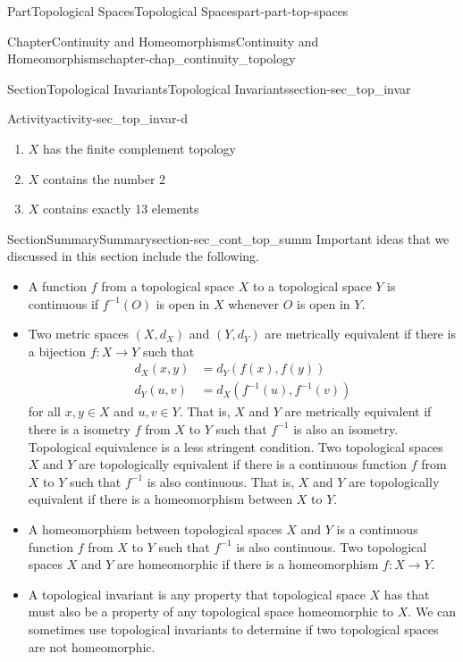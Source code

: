 \documentclass[oneside,10pt,]{book}
\numberwithin{equation}{chapter}
\newcommand{\amp}{&}
\begin{document}
\begin{partptx}{Part}{Topological Spaces}{}{Topological Spaces}{}{}{part-part-top-spaces}
\begin{chapterptx}{Chapter}{Continuity and Homeomorphisms}{}{Continuity and Homeomorphisms}{}{}{chapter-chap_continuity_topology}
\begin{sectionptx}{Section}{Topological Invariants}{}{Topological Invariants}{}{}{section-sec_top_invar}
\begin{activity}{Activity}{}{activity-sec_top_invar-d}
\begin{enumerate}[font=\bfseries,label=(\alph*),ref=\alph*]
\item{}\(X\) has the finite complement topology%
\item{}\(X\) contains the number 2%
\item{}\(X\) contains exactly 13 elements%
\end{enumerate}%
\end{activity}%
\end{sectionptx}
%
%
\typeout{************************************************}
\typeout{************************************************}
%
\begin{sectionptx}{Section}{Summary}{}{Summary}{}{}{section-sec_cont_top_summ}
Important ideas that we discussed in this section include the following.%
\begin{itemize}[label=\textbullet]
\item{}A function \(f\) from a topological space \(X\) to a topological space \(Y\) is continuous if \(f^{-1}(O)\) is open in \(X\) whenever \(O\) is open in \(Y\).%
\item{}Two metric spaces \((X,d_X)\) and \((Y,d_Y)\) are metrically equivalent if there is a bijection \(f : X \to Y\) such that%
\begin{align*}
d_X(x,y) \amp = d_Y(f(x),f(y))\\
d_Y(u,v) \amp = d_X(f^{-1}(u), f^{-1}(v))
\end{align*}
for all \(x,y \in X\) and \(u,v \in Y\). That is, \(X\) and \(Y\) are metrically equivalent if there is a isometry \(f\) from \(X\) to \(Y\) such that \(f^{-1}\) is also an isometry. Topological equivalence is a less stringent condition. Two topological spaces \(X\) and \(Y\) are topologically equivalent if there is a continuous function \(f\) from \(X\) to \(Y\) such that \(f^{-1}\) is also continuous. That is, \(X\) and \(Y\) are topologically equivalent if there is a homeomorphism between \(X\) to \(Y\).%
\item{}A homeomorphism between topological spaces \(X\) and \(Y\) is a continuous function \(f\) from \(X\) to \(Y\) such that \(f^{-1}\) is also continuous. Two topological spaces \(X\) and \(Y\) are homeomorphic if there is a homeomorphism \(f : X \to Y\).%
\item{}A topological invariant is any property that topological space \(X\) has that must also be a property of any topological space homeomorphic to \(X\). We can sometimes use topological invariants to determine if two topological spaces are not homeomorphic.%
\end{itemize}

\end{sectionptx}
\end{chapterptx}
\end{partptx}
\end{document}
